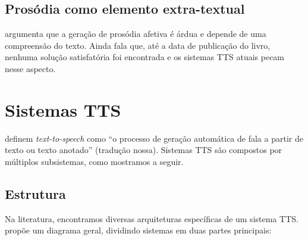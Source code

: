 \subsection{Prosódia como elemento extra-textual}
 argumenta que a geração de prosódia afetiva é árdua e
depende de uma compreensão do texto. Ainda fala que, até a data de publicação do
livro, nenhuma solução satisfatória foi encontrada e os sistemas TTS atuais
pecam nesse aspecto.

\section{Sistemas TTS}
 definem \emph{text-to-speech} como ``o processo de geração
automática de fala a partir de texto ou texto anotado'' (tradução nossa).
Sistemas TTS são compostos por múltiplos subsistemas, como mostramos a seguir.

\subsection{Estrutura}
Na literatura, encontramos diversas arquiteturas específicas de um sistema TTS.
 propõe um diagrama geral, dividindo sistemas em duas partes principais:

